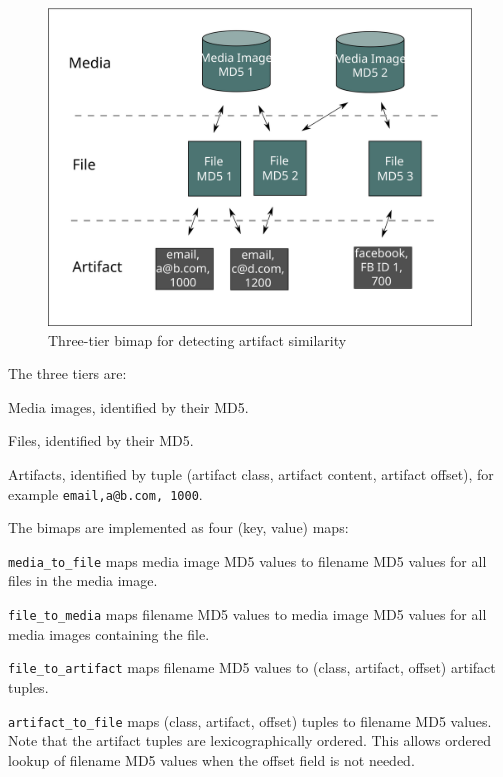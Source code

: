 \documentclass[12pt,twoside]{article}
\begin{document}
\begin{figure}
	\center
	\includegraphics[scale=.45]{three_tier_bimap}
	\caption{Three-tier bimap for detecting artifact similarity}
	\label{fig:threeTierBimap}
\end{figure}

The three tiers are:
\begin{compactitem}
\item Media images, identified by their MD5.
\item Files, identified by their MD5.
\item Artifacts, identified by tuple (artifact class, artifact content, artifact offset), for example \texttt{email,a@b.com, 1000}.
\end{compactitem}

The bimaps are implemented as four (key, value) maps:
\begin{compactitem}
\item \verb+media_to_file+ maps media image MD5 values to filename MD5 values for all files in the media image.
\item \verb+file_to_media+ maps filename MD5 values to media image MD5 values for all media images containing the file.
\item \verb+file_to_artifact+ maps filename MD5 values to (class, artifact, offset) artifact tuples.
\item \verb+artifact_to_file+ maps (class, artifact, offset) tuples to filename MD5 values. Note that the artifact tuples are lexicographically ordered. This allows ordered lookup of filename MD5 values when the offset field is not needed.
\end{compactitem}
\end{document}
